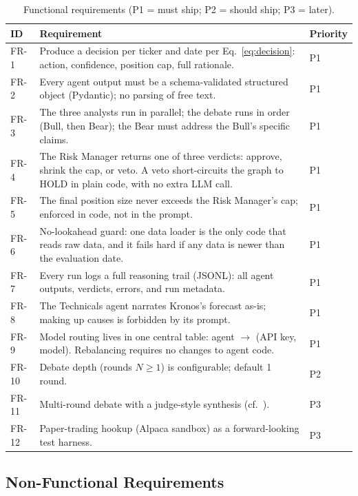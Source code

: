 \documentclass[conference]{IEEEtran}
\begin{document}
\begin{table}[!t]
\centering
\caption{Functional requirements (P1 = must ship; P2 = should ship; P3 = later).}
\label{tab:fr}
\small
\begin{tabularx}{\columnwidth}{L{0.75cm} X L{0.85cm}}
\toprule
\textbf{ID} & \textbf{Requirement} & \textbf{Priority} \\
\midrule
FR-1 & Produce a decision per ticker and date per Eq.~\ref{eq:decision}: action, confidence, position cap, full rationale. & P1 \\
FR-2 & Every agent output must be a schema-validated structured object (Pydantic); no parsing of free text. & P1 \\
FR-3 & The three analysts run in parallel; the debate runs in order (Bull, then Bear); the Bear must address the Bull's specific claims. & P1 \\
FR-4 & The Risk Manager returns one of three verdicts: approve, shrink the cap, or veto. A veto short-circuits the graph to HOLD in plain code, with no extra LLM call. & P1 \\
FR-5 & The final position size never exceeds the Risk Manager's cap; enforced in code, not in the prompt. & P1 \\
FR-6 & No-lookahead guard: one data loader is the only code that reads raw data, and it fails hard if any data is newer than the evaluation date. & P1 \\
FR-7 & Every run logs a full reasoning trail (JSONL): all agent outputs, verdicts, errors, and run metadata. & P1 \\
FR-8 & The Technicals agent narrates Kronos's forecast as-is; making up causes is forbidden by its prompt. & P1 \\
FR-9 & Model routing lives in one central table: agent $\rightarrow$ (API key, model). Rebalancing requires no changes to agent code. & P1 \\
FR-10 & Debate depth (rounds $N \ge 1$) is configurable; default 1 round. & P2 \\
FR-11 & Multi-round debate with a judge-style synthesis (cf.\ \cite{smit2024mad}). & P3 \\
FR-12 & Paper-trading hookup (Alpaca sandbox) as a forward-looking test harness. & P3 \\
\bottomrule
\end{tabularx}
\end{table}

\subsection{Non-Functional Requirements}
\end{document}
